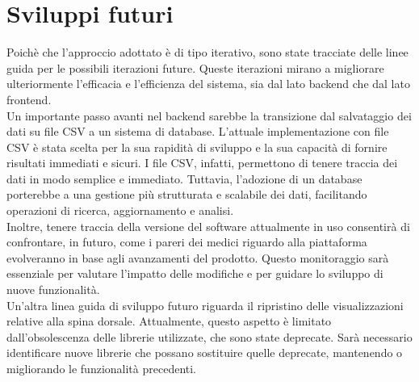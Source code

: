 \chapter{Sviluppi futuri}
\label{cap:sviluppi-futuri}

Poichè che l'approccio adottato è di tipo iterativo, sono state tracciate delle linee guida per le possibili iterazioni future. Queste iterazioni mirano a migliorare ulteriormente l'efficacia e l'efficienza del sistema, sia dal lato backend che dal lato frontend.\\

Un importante passo avanti nel backend sarebbe la transizione dal salvataggio dei dati su file CSV a un sistema di database. L'attuale implementazione con file CSV è stata scelta per la sua rapidità di sviluppo e la sua capacità di fornire risultati immediati e sicuri. I file CSV, infatti, permettono di tenere traccia dei dati in modo semplice e immediato. Tuttavia, l'adozione di un database porterebbe a una gestione più strutturata e scalabile dei dati, facilitando operazioni di ricerca, aggiornamento e analisi.\\
Inoltre, tenere traccia della versione del software attualmente in uso consentirà di confrontare, in futuro, come i pareri dei medici riguardo alla piattaforma evolveranno in base agli avanzamenti del prodotto. Questo monitoraggio sarà essenziale per valutare l'impatto delle modifiche e per guidare lo sviluppo di nuove funzionalità.\\
Un'altra linea guida di sviluppo futuro riguarda il ripristino delle visualizzazioni relative alla spina dorsale. Attualmente, questo aspetto è limitato dall'obsolescenza delle librerie utilizzate, che sono state deprecate. Sarà necessario identificare nuove librerie che possano sostituire quelle deprecate, mantenendo o migliorando le funzionalità precedenti.\\

